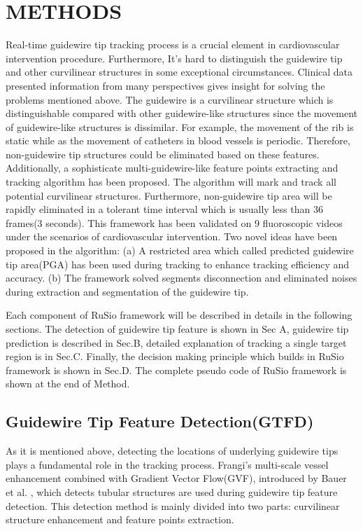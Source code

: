 \documentclass[letterpaper, 10 pt, conference]{ieeeconf}  %
\begin{document}
\section{METHODS}

Real-time guidewire tip tracking process is a crucial element in cardiovascular intervention procedure. Furthermore, It's hard to distinguish the guidewire tip and other curvilinear structures in some exceptional circumstances. Clinical data presented information from many perspectives gives insight for solving the problems mentioned above. The guidewire is a curvilinear structure which is distinguishable compared with other guidewire-like structures since the movement of guidewire-like structures is dissimilar. For example, the movement of the rib is static while as the movement of catheters in blood vessels is periodic. Therefore, non-guidewire tip structures could be eliminated based on these features. Additionally, a sophisticate multi-guidewire-like feature points extracting and tracking algorithm has been proposed. The algorithm will mark and track all potential curvilinear structures. Furthermore, non-guidewire tip area will be rapidly eliminated in a tolerant time interval which is usually less than 36 frames(3 seconds). This framework has been validated on 9 fluoroscopic videos under the scenarios of cardiovascular intervention. Two novel ideas have been proposed in the algorithm: (a) A restricted area which called predicted guidewire tip area(PGA) has been used during tracking to enhance tracking efficiency and accuracy. (b) The framework solved segments disconnection and eliminated noises during extraction and segmentation of the guidewire tip.
\par
Each component of RuSio framework will be described in details in the following sections. The detection of guidewire tip feature is shown in Sec A, guidewire tip prediction is described in Sec.B, detailed explanation of tracking a single target region is in Sec.C. Finally, the decision making principle which builds in RuSio framework is shown in Sec.D. The complete pseudo code of RuSio framework is shown at the end of Method.

\subsection{Guidewire Tip Feature Detection(GTFD)}

As it is mentioned above, detecting the locations of underlying guidewire tips plays a fundamental role in the tracking process. Frangi's multi-scale vessel enhancement\cite{c9} combined with Gradient Vector Flow(GVF), introduced by Bauer et al. \cite{c10}, which detects tubular structures are used during guidewire tip feature detection. This detection method is mainly divided into two parts: curvilinear structure enhancement and feature points extraction.
\end{document}
